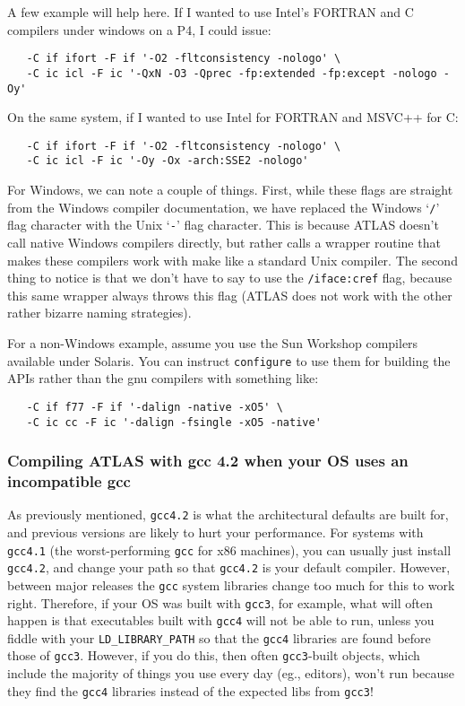 \documentclass[11pt]{article}
\begin{document}
A few example will help here.  If I wanted to use Intel's FORTRAN and C
compilers under windows on a P4, I could issue:
\vspace*{-0.1in}
\begin{verbatim}
   -C if ifort -F if '-O2 -fltconsistency -nologo' \
   -C ic icl -F ic '-QxN -O3 -Qprec -fp:extended -fp:except -nologo -Oy'
\end{verbatim}

On the same system, if I wanted to use Intel for FORTRAN and MSVC++ for C:
\vspace*{-0.1in}
\begin{verbatim}
   -C if ifort -F if '-O2 -fltconsistency -nologo' \
   -C ic icl -F ic '-Oy -Ox -arch:SSE2 -nologo'
\end{verbatim}

For Windows, we can note a couple of things.  First, while these flags are
straight from the Windows compiler documentation, we have replaced the
Windows `{\tt /}' flag character with the Unix `{\tt -}' flag character.
This is because ATLAS doesn't call native Windows compilers directly, but
rather calls a wrapper routine that makes these compilers work with make
like a standard Unix compiler.  The second thing to notice is that we don't
have to say to use the {\tt /iface:cref} flag, because this same wrapper
always throws this flag (ATLAS does not work with the other rather bizarre
naming strategies).

For a non-Windows example, assume you use the Sun Workshop compilers available
under Solaris.  You can instruct {\tt configure} to use them for building the
APIs rather than the gnu compilers with something like:
\vspace*{-0.1in}
\begin{verbatim}
   -C if f77 -F if '-dalign -native -xO5' \
   -C ic cc -F ic '-dalign -fsingle -xO5 -native'
\end{verbatim}

\subsubsection{Compiling ATLAS with gcc 4.2 when your OS uses an
incompatible gcc}
\label{sec-cc-4v3}

As previously mentioned, {\tt gcc4.2} is what the architectural defaults
are built for, and previous versions are likely to hurt your performance.
For systems with {\tt gcc4.1} (the worst-performing {\tt gcc} for x86
machines), you can usually just install {\tt gcc4.2}, and change your
path so that {\tt gcc4.2} is your default compiler.  However, between
major releases the {\tt gcc} system libraries change too much for this
to work right.  Therefore, if your OS was built with {\tt gcc3}, for example,
what will often happen is that executables built with {\tt gcc4} will
not be able to run, unless you fiddle with your {\tt LD\_LIBRARY\_PATH} so
that the {\tt gcc4} libraries are found before those of {\tt gcc3}.
However, if you do this, then often {\tt gcc3}-built objects, which include
the majority of things you use every day (eg., editors), won't run because
they find the {\tt gcc4} libraries instead of the expected libs from {\tt gcc3}!
\end{document}
